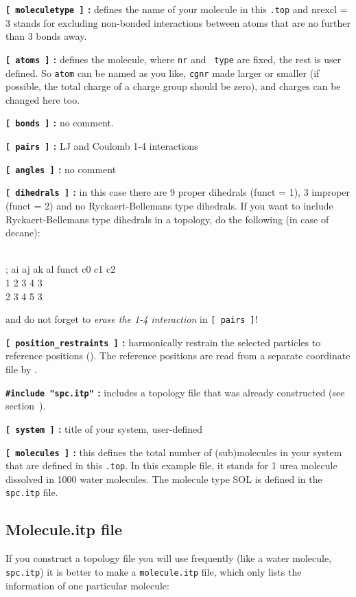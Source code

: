 {\bf {\tt [~moleculetype~]} :} defines the name of your molecule in
this {\tt *.top} and nrexcl = 3 stands for excluding non-bonded
interactions between atoms that are no further than 3 bonds away.

{\bf {\tt [~atoms~]} :} defines the molecule, where {\tt nr} and {\tt
type} are fixed, the rest is user defined. So {\tt atom} can be named
as you like, {\tt cgnr} made larger or smaller (if possible, the total
charge of a charge group should be zero), and charges can be changed
here too.

{\bf {\tt [~bonds~]} :} no comment.

{\bf {\tt [~pairs~]} :} LJ and Coulomb 1-4 interactions

{\bf {\tt [~angles~]} :} no comment

{\bf {\tt [~dihedrals~]} :} in this case there are 9 proper dihedrals
(funct = 1), 3 improper (funct = 2) and no Ryckaert-Bellemans type
dihedrals. If you want to include Ryckaert-Bellemans type dihedrals
in a topology, do the following (in case of {\eg} decane):\\
\begin{tt}
[ dihedrals ]\\
;  ai    aj    ak    al funct       c0       c1       c2\\
    1    2     3     4     3 \\
    2    3     4     5     3\\
\end{tt}
and do not forget to {\em erase the 1-4 interaction} 
in {\tt [~pairs~]}!

{\bf {\tt [~position\_restraints~]} :} harmonically restrain the selected particles
to reference positions (). 
The reference positions are read from a 
separate coordinate file by .

{\bf {\tt \#include "spc.itp"} :} includes a topology file that was already
constructed (see section~).

{\bf {\tt [~system~]} :} title of your system, user-defined

{\bf {\tt [~molecules~]} :} this defines the total number of (sub)molecules
in your system that are defined in this {\tt *.top}. In this
example file, it stands for 1 urea molecule dissolved in 1000 water
molecules. The molecule type SOL is defined in the {\tt spc.itp} file.

\subsection{Molecule.itp file}
\label{subsec:molitp}
If you construct a topology file you will use frequently (like a water
molecule, {\tt spc.itp}) it is better to make a {\tt molecule.itp}
file, which only lists the information of one particular molecule: 

